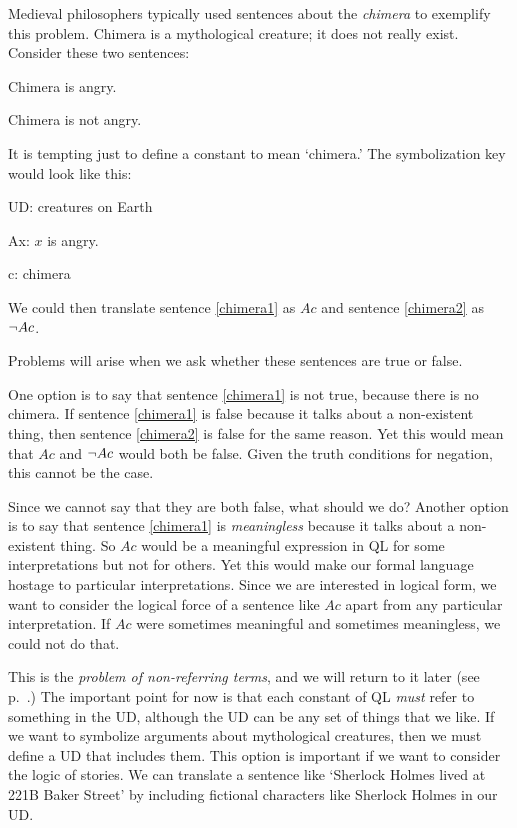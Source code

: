 Medieval philosophers typically used sentences about the \emph{chimera} to exemplify this problem. Chimera is a mythological creature; it does not really exist. Consider these two sentences:
\begin{earg}
\item[\ex{chimera1}] Chimera is angry.
\item[\ex{chimera2}] Chimera is not angry.
\end{earg}
It is tempting just to define a constant to mean `chimera.' The symbolization key would look like this:
\begin{ekey}
\item[UD:] creatures on Earth
\item[Ax:] $x$ is angry.
\item[c:] chimera
\end{ekey}
We could then translate sentence \ref{chimera1} as $Ac$ and sentence \ref{chimera2} as $\neg Ac$.

Problems will arise when we ask whether these sentences are true or false.

One option is to say that sentence \ref{chimera1} is not true, because there is no chimera. If sentence \ref{chimera1} is false because it talks about a non-existent thing, then sentence \ref{chimera2} is false for the same reason. Yet this would mean that $Ac$ and $\neg Ac$ would both be false. Given the truth conditions for negation, this cannot be the case.

Since we cannot say that they are both false, what should we do? Another option is to say that sentence \ref{chimera1} is \emph{meaningless} because it talks about a non-existent thing. So $Ac$ would be a meaningful expression in QL for some interpretations but not for others. Yet this would make our formal language hostage to particular interpretations. Since we are interested in logical form, we want to consider the logical force of a sentence like $Ac$ apart from any particular interpretation. If $Ac$ were sometimes meaningful and sometimes meaningless, we could not do that.

This is the \emph{problem of non-referring terms}, and we will return to it later (see p.~\pageref{subsec.defdesc}.) The important point for now is that each constant of QL \emph{must} refer to something in the UD, although the UD can be any set of things that we like. If we want to symbolize arguments about mythological creatures, then we must define a UD that includes them. This option is important if we want to consider the logic of stories. We can translate a sentence like `Sherlock Holmes lived at 221B Baker Street' by including fictional characters like Sherlock Holmes in our UD.



